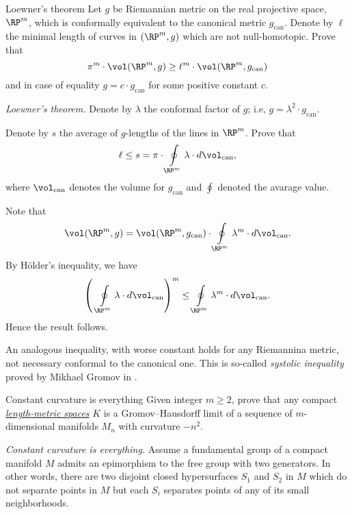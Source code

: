 \begin{pr}{}{Loewner's theorem}
\label{Loewner's theorem}
Let $g$ be Riemannian metric
on the real projective space, $\RP^m$,
which is
conformally equivalent to the canonical metric $g_{\text{can}}$.
Denote by $\ell$ the minimal length of curves in $(\RP^m,g)$ which are not null-homotopic. 
Prove that 
$$\pi^m\cdot\vol(\RP^m,g)
\ge 
\ell^m
\cdot
\vol(\RP^m,g_{\text{can}})$$ 
and in case of equality $g=c\cdot g_{\text{can}}$ for some positive constant $c$.
\end{pr}

\textit{Loewner's theorem.}
Denote by $\lambda$ the conformal factor of $g$;
i.e, $g=\lambda^2\cdot g_{\mathrm{can}}$.

Denote by $s$ the average of $g$-lengths of the lines in $\RP^m$.
Prove that 
\[\ell \le s=\pi\cdot\oint\limits_{\RP^m}\lambda\cdot d\vol_{\mathrm{can}},\]
where $\vol_{\mathrm{can}}$ denotes the volume for $g_{\mathrm{can}}$ and $\oint$ denoted the avarage value.

Note that
\[\vol(\RP^m,g)
=
\vol(\RP^m,g_{\mathrm{can}})
\cdot
\oint\limits_{\RP^m}\lambda^m\cdot d\vol_{\mathrm{can}}.\]
By H\"older's inequality, we have
\[\left(\,\,\oint\limits_{\RP^m}\lambda\cdot d\vol_{\mathrm{can}}\right)^m
\le \oint\limits_{\RP^m}\lambda^m\cdot d\vol_{\mathrm{can}}.\]
Hence the result follows.

An analogous inequality,
with worse constant holds for any Riemannina metric, 
not necessary conformal to the canonical one.
This is so-called \emph{systolic inequality} proved by Mikhael Gromov in \cite{gromov-filling}.



















\begin{pr}{\thm}{Constant curvature is everything}\label{figure-eight-2} Given integer $m\ge 2$, prove that any compact \hyperref[Length-metric space]{\emph{length-metric spaces}} $K$ is a Gromov--Hausdorff limit of a sequence of $m$-dimensional
manifolds $M_n$ with curvature $-n^2$.
\end{pr}

\textit{Constant curvature is everything.}
Assume a fundamental group of a compact manifold $M$ admits an epimorphism to the free group with two generators.
In other words, there are two disjoint closed hypersurfaces $S_1$ and $S_2$ in $M$ 
which do not separate points in $M$
but each $S_i$ separates points of any of its small neighborhoods.

